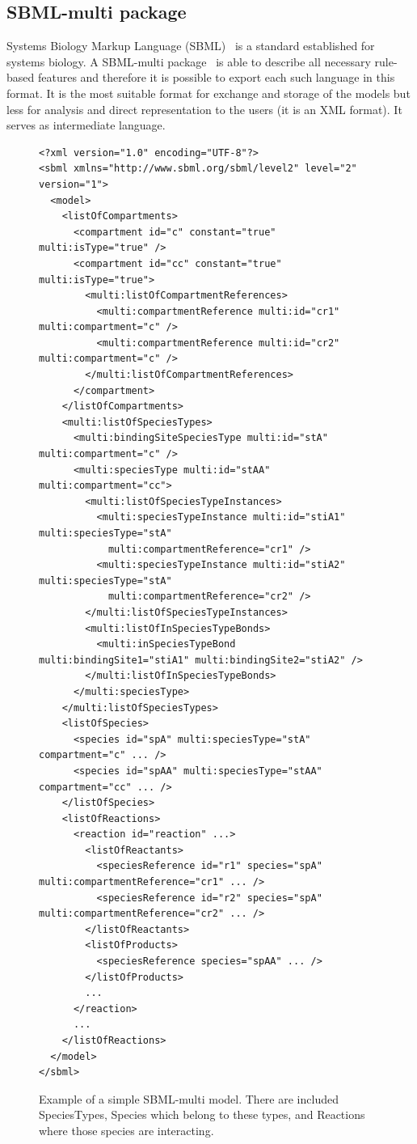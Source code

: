 \documentclass[12pt]{fithesis2}
\begin{document}
\subsection{SBML-multi package}

Systems Biology Markup Language (SBML)~\cite{hucka2003systems} is a standard established for systems biology. A SBML-multi package~\cite{zhang2015sbml} is able to describe all necessary rule-based features and therefore it is possible to export each such language in this format. It is the most suitable format for exchange and storage of the models but less for analysis and direct representation to the users (it is an XML format). It serves as intermediate language.

\begin{figure}[!h]
\lstset{language=XML}
\begin{lstlisting}[basicstyle=\tiny, frame=single]
<?xml version="1.0" encoding="UTF-8"?>
<sbml xmlns="http://www.sbml.org/sbml/level2" level="2" version="1">
  <model>
    <listOfCompartments>
      <compartment id="c" constant="true" multi:isType="true" />
      <compartment id="cc" constant="true" multi:isType="true">
        <multi:listOfCompartmentReferences>
          <multi:compartmentReference multi:id="cr1" multi:compartment="c" />
          <multi:compartmentReference multi:id="cr2" multi:compartment="c" />
        </multi:listOfCompartmentReferences>
      </compartment>
    </listOfCompartments>
    <multi:listOfSpeciesTypes>
      <multi:bindingSiteSpeciesType multi:id="stA" multi:compartment="c" />
      <multi:speciesType multi:id="stAA" multi:compartment="cc">
        <multi:listOfSpeciesTypeInstances>
          <multi:speciesTypeInstance multi:id="stiA1" multi:speciesType="stA"
            multi:compartmentReference="cr1" />
          <multi:speciesTypeInstance multi:id="stiA2" multi:speciesType="stA"
            multi:compartmentReference="cr2" />
        </multi:listOfSpeciesTypeInstances>
        <multi:listOfInSpeciesTypeBonds>
          <multi:inSpeciesTypeBond multi:bindingSite1="stiA1" multi:bindingSite2="stiA2" />
        </multi:listOfInSpeciesTypeBonds>
      </multi:speciesType>
    </multi:listOfSpeciesTypes>
    <listOfSpecies>
      <species id="spA" multi:speciesType="stA" compartment="c" ... />
      <species id="spAA" multi:speciesType="stAA" compartment="cc" ... />
    </listOfSpecies>
    <listOfReactions>
      <reaction id="reaction" ...>
        <listOfReactants>
          <speciesReference id="r1" species="spA" multi:compartmentReference="cr1" ... />
          <speciesReference id="r2" species="spA" multi:compartmentReference="cr2" ... />
        </listOfReactants>
        <listOfProducts>
          <speciesReference species="spAA" ... />
        </listOfProducts>
        ...
      </reaction>
      ...
    </listOfReactions>
  </model>
</sbml>
\end{lstlisting}
\caption{Example of a simple SBML-multi model. There are included SpeciesTypes, Species which belong to these types, and Reactions where those species are interacting.}\label{SBML_example}
\end{figure}
\end{document}
